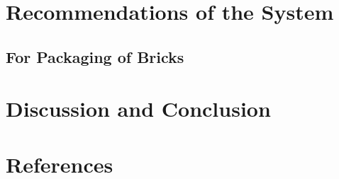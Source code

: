 \documentclass[12pt,a4paper]{article}
\begin{document}

\newpage




\newpage
\tableofcontents
{}

\newpage
{}




\newpage
\section{Recommendations of the System}


\subsection{For Packaging of Bricks}

\section{Discussion and Conclusion}



\section{References}
\end{document}
